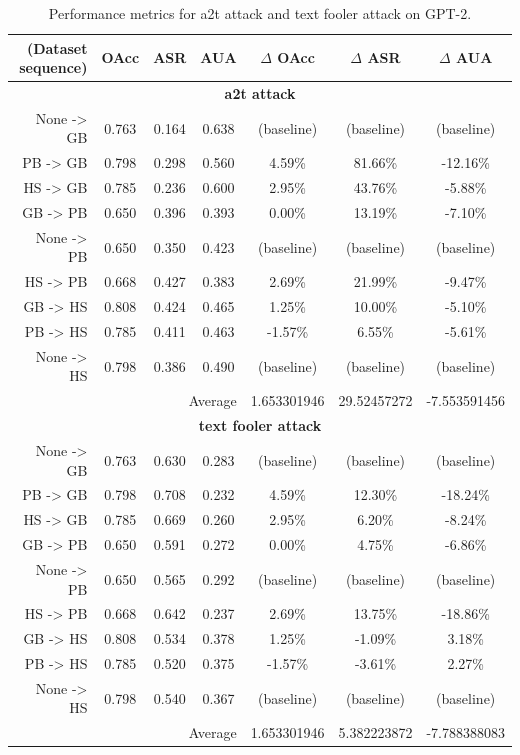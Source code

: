 \documentclass{article}
\begin{document}
\begin{table}[ht]
\centering
\caption{Performance metrics for a2t attack and text fooler attack on GPT-2.}
\small
\begin{tabular}{r|ccc|ccc}
\hline
\textbf{(Dataset sequence)} & \textbf{OAcc} & \textbf{ASR} & \textbf{AUA} & \textbf{$\Delta$ OAcc} & \textbf{$\Delta$ ASR} & \textbf{$\Delta$ AUA} \\ \hline
\multicolumn{7}{c}{\textbf{a2t attack}} \\ \hline
None -> GB & 0.763 & 0.164 & 0.638 & (baseline) & (baseline) & (baseline) \\
PB -> GB & 0.798 & 0.298 & 0.560 & 4.59\% & 81.66\% & -12.16\% \\
HS -> GB & 0.785 & 0.236 & 0.600 & 2.95\% & 43.76\% & -5.88\% \\
GB -> PB & 0.650 & 0.396 & 0.393 & 0.00\% & 13.19\% & -7.10\% \\
None -> PB & 0.650 & 0.350 & 0.423 & (baseline) & (baseline) & (baseline) \\
HS -> PB & 0.668 & 0.427 & 0.383 & 2.69\% & 21.99\% & -9.47\% \\
GB -> HS & 0.808 & 0.424 & 0.465 & 1.25\% & 10.00\% & -5.10\% \\
PB -> HS & 0.785 & 0.411 & 0.463 & -1.57\% & 6.55\% & -5.61\% \\
None -> HS & 0.798 & 0.386 & 0.490 & (baseline) & (baseline) & (baseline) \\ \hline
\multicolumn{4}{r|}{Average} & 1.653301946 & 29.52457272 & -7.553591456 \\ \hline
\multicolumn{7}{c}{\textbf{text fooler attack}} \\ \hline
None -> GB & 0.763 & 0.630 & 0.283 & (baseline) & (baseline) & (baseline) \\
PB -> GB & 0.798 & 0.708 & 0.232 & 4.59\% & 12.30\% & -18.24\% \\
HS -> GB & 0.785 & 0.669 & 0.260 & 2.95\% & 6.20\% & -8.24\% \\
GB -> PB & 0.650 & 0.591 & 0.272 & 0.00\% & 4.75\% & -6.86\% \\
None -> PB & 0.650 & 0.565 & 0.292 & (baseline) & (baseline) & (baseline) \\
HS -> PB & 0.668 & 0.642 & 0.237 & 2.69\% & 13.75\% & -18.86\% \\
GB -> HS & 0.808 & 0.534 & 0.378 & 1.25\% & -1.09\% & 3.18\% \\
PB -> HS & 0.785 & 0.520 & 0.375 & -1.57\% & -3.61\% & 2.27\% \\
None -> HS & 0.798 & 0.540 & 0.367 & (baseline) & (baseline) & (baseline) \\ \hline
\multicolumn{4}{r|}{Average} & 1.653301946 & 5.382223872 & -7.788388083 \\ \hline
\end{tabular}
\label{table:gpt2_attack_comparison}
\end{table}
\end{document}
